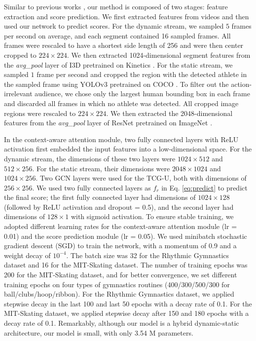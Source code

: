 \documentclass[sigconf]{acmart}
\begin{document}
Similar to previous works \cite{parmar2017learning,xu2019learning}, our method is composed of two stages: feature extraction and score prediction. We first extracted features from videos and then used our network to predict scores. For the dynamic stream, we sampled $5$ frames per second on average, and each segment contained 16 sampled frames. All frames were rescaled to have a shortest side length of 256 and were then center cropped to $224 \times 224$. We then extracted 1024-dimensional segment features from the \emph{avg\_pool} layer of I3D pretrained on Kinetics \cite{carreira2017quo}. For the static stream, we sampled $1$ frame per second and cropped the region with the detected athlete in the sampled frame using YOLOv3 \cite{redmon2018yolov3} pretrained on COCO \cite{lin2014microsoft}. To filter out the action-irrelevant audience, we chose only the largest human bounding box in each frame and discarded all frames in which no athlete was detected. All cropped image regions were rescaled to $224 \times 224$. We then extracted the 2048-dimensional features from the \emph{avg\_pool} layer of ResNet \cite{he2016deep} pretrained on ImageNet \cite{russakovsky2015imagenet}.

\vspace{5pt}

In the context-aware attention module, two fully connected layers with ReLU activation first embedded the input features into a low-dimensional space. For the dynamic stream, the dimensions of these two layers were $1024 \times 512$ and $512 \times 256$. For the static stream, their dimensions were $2048 \times 1024$ and $1024 \times 256$. Two GCN layers were used for the TCG-U, both with dimensions of $ 256 \times 256$. We used two fully connected layers as $f_r$ in Eq. \ref{eq:predict} to predict the final score; the first fully connected layer had dimensions of $1024 \times 128$ (followed by ReLU activation and dropout = 0.5), and the second layer had dimensions of $128 \times 1$ with sigmoid activation. To ensure stable training, we adopted different learning rates for the context-aware attention module (lr = 0.01) and the score prediction module (lr = 0.05). We used minibatch stochastic gradient descent (SGD) to train the network, with a momentum of 0.9 and a weight decay of $ 10^{-4}$. The batch size was 32 for the Rhythmic Gymnastics dataset and 16 for the MIT-Skating dataset. The number of training epochs was 200 for the MIT-Skating dataset, and for better convergence, we set different training epochs on four types of gymnastics routines (400/300/500/300 for ball/clubs/hoop/ribbon). For the Rhythmic Gymnastics dataset, we applied stepwise decay in the last 100 and last 50 epochs with a decay rate of 0.1. For the MIT-Skating dataset, we applied stepwise decay after 150 and 180 epochs with a decay rate of 0.1. Remarkably, although our model is a hybrid dynamic-static architecture, our model is small, with only 3.54 M parameters.
\end{document}
